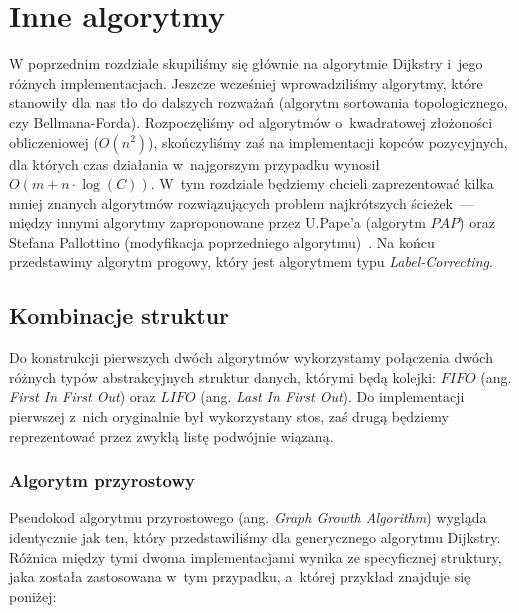 \chapter{Inne algorytmy}
\thispagestyle{chapterBeginStyle}
	




W poprzednim rozdziale skupiliśmy się głównie na algorytmie Dijkstry i~jego różnych implementacjach.
Jeszcze wcześniej wprowadziliśmy algorytmy, które stanowiły dla nas tło do dalszych rozważań (algorytm sortowania topologicznego, czy Bellmana-Forda).
Rozpoczęliśmy od algorytmów o~kwadratowej złożoności obliczeniowej ($O \left( n^{2} \right)$), skończyliśmy zaś na implementacji kopców pozycyjnych, dla których czas działania w~najgorszym przypadku wynosił $O \left( m + n \cdot \log \left( C \right) \right)$.
W~tym rozdziale będziemy chcieli zaprezentować kilka mniej znanych algorytmów rozwiązujących problem najkrótszych ścieżek~--- między innymi algorytmy zaproponowane przez U.Pape'a (algorytm $PAP$) oraz Stefana Pallottino (modyfikacja poprzedniego algorytmu)~\cite[$4.$]{GIDA}.
Na końcu przedstawimy algorytm progowy, który jest algorytmem typu \textit{Label-Correcting}.




\section{Kombinacje struktur}




Do konstrukcji pierwszych dwóch algorytmów wykorzystamy połączenia dwóch różnych typów abstrakcyjnych struktur danych, którymi będą kolejki: $FIFO$ (ang. \textit{First In First Out}) oraz $LIFO$ (ang. \textit{Last In First Out}).
Do implementacji pierwszej z~nich oryginalnie był wykorzystany stos, zaś drugą będziemy reprezentować przez zwykłą listę podwójnie wiązaną.



\subsection{Algorytm przyrostowy}



Pseudokod algorytmu przyrostowego (ang. \textit{Graph Growth Algorithm}) wygląda identycznie jak ten, który przedstawiliśmy dla generycznego algorytmu Dijkstry.
Różnica między tymi dwoma implementacjami wynika ze specyficznej struktury, jaka została zastosowana w~tym przypadku, a~której przykład znajduje się poniżej:

